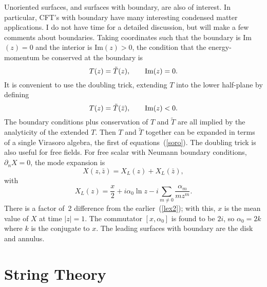 Unoriented surfaces, and surfaces with boundary, are also of interest.
In particular, CFT's with boundary have many interesting condensed
matter applications.  I do not have time for a detailed discussion,
but
will make a few comments about boundaries.  Taking coordinates such
that the boundary is Im$(z) = 0$ and the interior is Im$(z) > 0$, the
condition that the energy-momentum be conserved at the boundary is
\begin{equation}
T(z) = \tilde T(z), \qquad {\rm Im}(z)=0. \label{tbound}
\end{equation}
It is convenient to use the doubling trick, extending $T$ into the
lower half-plane by defining
\begin{equation}
T(z) = \tilde T(\bar z), \qquad {\rm Im}(z) < 0.
\end{equation}
The boundary conditions plus conservation of $T$ and $\tilde T$ are
all implied by the analyticity of the extended $T$.  Then $T$ and
$\tilde T$ together can be expanded in terms of a single Virasoro
algebra, the first of equations~(\ref{soro}).  The doubling trick is
also useful for free fields.  For free scalar with Neumann boundary
conditions, $\partial_n X = 0$, the mode expansion is
\begin{equation}
X(z,\bar z) = X_L(z) + X_L(\bar z), \label{neu}
\end{equation}
with
\begin{equation}
X_L(z) = \frac{x}{2} + i \alpha_0 \ln z
- i \sum_{m \neq 0} \frac{\alpha_m}{mz^{m}}. \label{osmode}
\end{equation}
There is a factor of~2 difference from the earlier~(\ref{lex2});
with this, $x$ is the mean value of $X$ at time $|z|=1$.
The commutator $[x,\alpha_0]$ is found to be $2i$, so $\alpha_0 =
2k$ where $k$ is the conjugate to $x$.  The leading
surfaces with boundary are the disk and annulus.

\section{String Theory}
\setcounter{footnote}{0}


